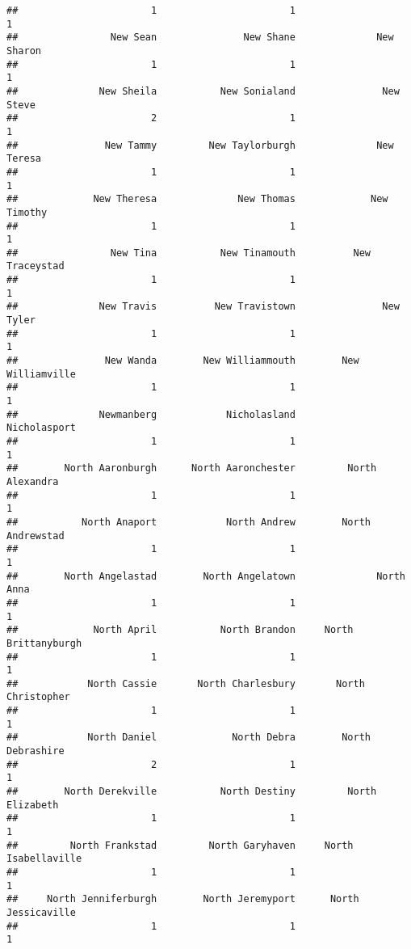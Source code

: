 \documentclass[
]{article}
\begin{document}
\begin{verbatim}
##                       1                       1                       1 
##                New Sean               New Shane              New Sharon 
##                       1                       1                       1 
##              New Sheila           New Sonialand               New Steve 
##                       2                       1                       1 
##               New Tammy         New Taylorburgh              New Teresa 
##                       1                       1                       1 
##             New Theresa              New Thomas             New Timothy 
##                       1                       1                       1 
##                New Tina           New Tinamouth          New Traceystad 
##                       1                       1                       1 
##              New Travis          New Travistown               New Tyler 
##                       1                       1                       1 
##               New Wanda        New Williammouth        New Williamville 
##                       1                       1                       1 
##              Newmanberg            Nicholasland            Nicholasport 
##                       1                       1                       1 
##        North Aaronburgh      North Aaronchester         North Alexandra 
##                       1                       1                       1 
##           North Anaport            North Andrew        North Andrewstad 
##                       1                       1                       1 
##        North Angelastad        North Angelatown              North Anna 
##                       1                       1                       1 
##             North April           North Brandon     North Brittanyburgh 
##                       1                       1                       1 
##            North Cassie       North Charlesbury       North Christopher 
##                       1                       1                       1 
##            North Daniel             North Debra        North Debrashire 
##                       2                       1                       1 
##        North Derekville           North Destiny         North Elizabeth 
##                       1                       1                       1 
##         North Frankstad         North Garyhaven     North Isabellaville 
##                       1                       1                       1 
##     North Jenniferburgh        North Jeremyport      North Jessicaville 
##                       1                       1                       1 

\end{verbatim}
\end{document}
